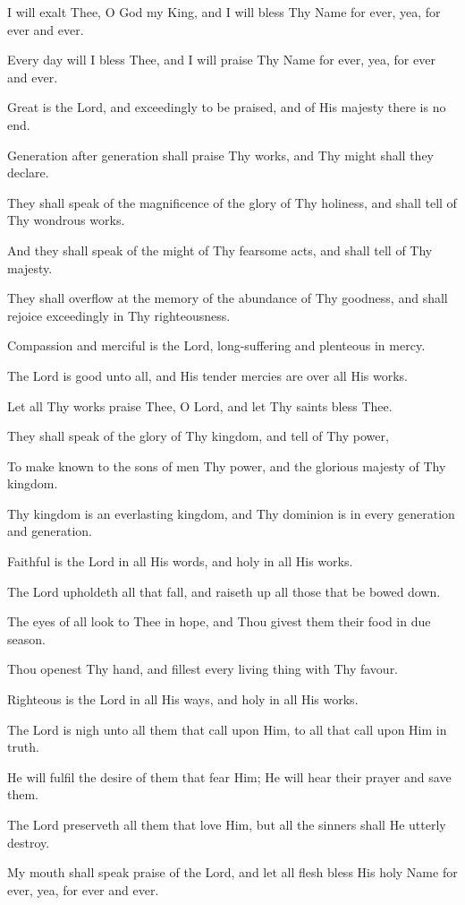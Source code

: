 I will exalt Thee, O God my King, and I will bless Thy Name for ever, yea, for ever and ever.

Every day will I bless Thee, and I will praise Thy Name for ever, yea, for ever and ever.

Great is the Lord, and exceedingly to be praised, and of His majesty there is no end.

Generation after generation shall praise Thy works, and Thy might shall they declare.

They shall speak of the magnificence of the glory of Thy holiness, and shall tell of Thy wondrous works.

And they shall speak of the might of Thy fearsome acts, and shall tell of Thy majesty.

They shall overflow at the memory of the abundance of Thy goodness, and shall rejoice exceedingly in Thy righteousness.

Compassion and merciful is the Lord, long-suffering and plenteous in mercy.

The Lord is good unto all, and His tender mercies are over all His works.

Let all Thy works praise Thee, O Lord, and let Thy saints bless Thee.

They shall speak of the glory of Thy kingdom, and tell of Thy power,

To make known to the sons of men Thy power, and the glorious majesty of Thy kingdom.

Thy kingdom is an everlasting kingdom, and Thy dominion is in every generation and generation.

Faithful is the Lord in all His words, and holy in all His works.

The Lord upholdeth all that fall, and raiseth up all those that be bowed down.
 
The eyes of all look to Thee in hope, and Thou givest them their food in due season.

Thou openest Thy hand, and fillest every living thing with Thy favour.

Righteous is the Lord in all His ways, and holy in all His works.

The Lord is nigh unto all them that call upon Him, to all that call upon Him in truth.

He will fulfil the desire of them that fear Him; He will hear their prayer and save them.

The Lord preserveth all them that love Him, but all the sinners shall He utterly destroy.

My mouth shall speak praise of the Lord, and let all flesh bless His holy Name for ever, yea, for ever and ever.
